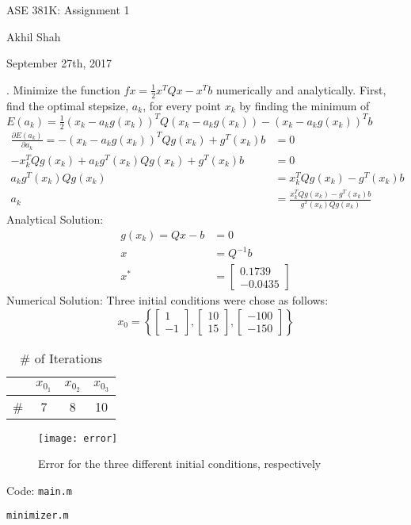 \documentclass{article}
\begin{document}
\begin{center}
	{\huge ASE 381K: Assignment 1}
\end{center}
\begin{center}
	Akhil Shah
\end{center}
\begin{center}
	September 27th, 2017
\end{center}

. Minimize the function $f{x} = \frac{1}{2}x^TQx - x^Tb$ numerically and analytically. \newline\newline
First, find the optimal stepsize, $a_k$, for every point $x_k$ by finding the minimum of $E(a_k) = \frac{1}{2}(x_k - a_kg(x_k))^TQ(x_k - a_kg(x_k)) - (x_k - a_kg(x_k))^Tb$
\begin{align*}
	\frac{\partial E(a_k)}{\partial a_k} = -(x_k - a_kg(x_k))^TQg(x_k) + g^T(x_k)b &= 0 \\
	-x_k^TQg(x_k) + a_kg^T(x_k)Qg(x_k) + g^T(x_k)b &= 0 \\
	a_kg^T(x_k)Qg(x_k) &= x_k^TQg(x_k) - g^T(x_k)b \\
	a_k &= \frac{x_k^TQg(x_k) - g^T(x_k)b}{g^T(x_k)Qg(x_k)}
\end{align*}
Analytical Solution:
\begin{align*}
	g(x_k) = Qx - b  &= 0 \\
	x &= Q^{-1}b \\
	x^* &= \begin{bmatrix}
		0.1739 \\
		-0.0435
		\end{bmatrix}
\end{align*}
Numerical Solution:
Three initial conditions were chose as follows:
\begin{equation*}
	x_0 = \left\{
	\begin{bmatrix}
		1 \\ -1
	\end{bmatrix},
	\begin{bmatrix}
		10 \\ 15
	\end{bmatrix},
	\begin{bmatrix}
		-100 \\ -150
	\end{bmatrix}
	\right\}
\end{equation*}
\begin{table}[H]
	\centering
	\caption{\# of Iterations}
	\begin{tabular}{c| c c c}
	& $x_{0_1}$ & $x_{0_2}$  & $x_{0_3}$ \\
	\hline
	\# & 7 & 8 & 10
	\end{tabular}
\end{table}
\begin{figure}[H]
	\centering
	\texttt{[image: error]}
	\caption{Error for the three different initial conditions, respectively}
\end{figure}

\newpage
\noindent
{\huge Code:} \newline
\texttt{main.m}

\texttt{minimizer.m}

\end{document}
